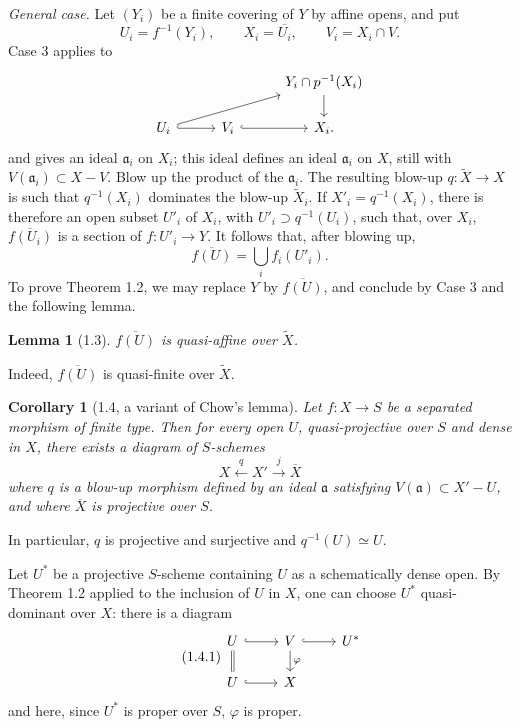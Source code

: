 \documentclass[10pt,a4paper]{article}
\theoremstyle{deligne}
\newtheorem*{lemma*}{Lemma}
\newtheorem*{corollary*}{Corollary}
\begin{document}
\textit{General case.} Let \((Y_i)\) be a finite covering of \(Y\) by affine opens, and put
\[
U_i=f^{-1}(Y_i),\qquad X_i=\overline{U_i},\qquad V_i=X_i\cap V.
\]
Case 3 applies to
\[
\begin{tikzcd}[column sep=2.8em,row sep=1.6em]
&& Y_i\cap p^{-1}(X_i) \arrow[d] \\
U_i \arrow[r,hook] \arrow[urr] & V_i \arrow[r,hook] & X_i .
\end{tikzcd}
\]
and gives an ideal \(\mathfrak a_i\) on \(X_i\); this ideal defines an ideal \(\mathfrak a_i\) on \(X\), still with \(V(\mathfrak a_i)\subset X-V\). Blow up the product of the \(\mathfrak a_i\). The resulting blow-up \(q:\widetilde X\to X\) is such that \(q^{-1}(X_i)\) dominates the blow-up \(\widetilde X_i\). If \(X'_i=q^{-1}(X_i)\), there is therefore an open subset \(U'_i\) of \(X_i\), with \(U'_i\supset q^{-1}(U_i)\), such that, over \(X_i\), \(\overline{f(U_i)}\) is a section of \(f:U'_i\to Y\). It follows that, after blowing up,
\[
\overline{f(U)}=\bigcup_i f_i(U'_i).
\]
To prove Theorem 1.2, we may replace \(Y\) by \(\overline{f(U)}\), and conclude by Case 3 and the following lemma.

\begin{lemma*}[1.3]
\(\overline{f(U)}\) is quasi-affine over \(\widetilde X\).
\end{lemma*}
Indeed, \(\overline{f(U)}\) is quasi-finite over \(\widetilde X\).

\begin{corollary*}[1.4, a variant of Chow's lemma]
Let \(f:X\to S\) be a separated morphism of finite type. Then for every open \(U\), quasi-projective over \(S\) and dense in \(X\), there exists a diagram of \(S\)-schemes
\[
X \xleftarrow{q} X' \xrightarrow{j} \overline X
\]
where \(q\) is a blow-up morphism defined by an ideal \(\mathfrak a\) satisfying \(V(\mathfrak a)\subset X'-U\), and where \(\overline X\) is projective over \(S\).
\end{corollary*}
In particular, \(q\) is projective and surjective and \(q^{-1}(U)\simeq U\).

Let \(U^*\) be a projective \(S\)-scheme containing \(U\) as a schematically dense open. By Theorem 1.2 applied to the inclusion of \(U\) in \(X\), one can choose \(U^*\) quasi-dominant over \(X\): there is a diagram
\[
\tag{1.4.1}
\begin{tikzcd}[column sep=2.4em,row sep=1.5em]
U \arrow[r,hook] \arrow[d,equal] & V \arrow[r,hook] \arrow[d,"\varphi"] & U^* \\
U \arrow[r,hook] & X
\end{tikzcd}
\]
and here, since \(U^*\) is proper over \(S\), \(\varphi\) is proper.
\end{document}
